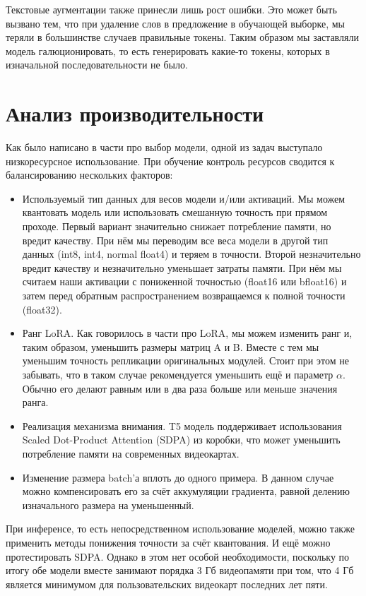 Текстовые аугментации также принесли лишь рост ошибки.
Это может быть вызвано тем, что при удаление слов в предложение в обучающей выборке, мы теряли в большинстве случаев правильные токены.
Таким образом мы заставляли модель галюционировать, то есть генерировать какие-то токены, которых в изначальной последовательности не было.

\section{Анализ производительности}
Как было написано в части про выбор модели, одной из задач выступало низкоресурсное использование.
При обучение контроль ресурсов сводится к балансированию нескольких факторов:

\begin{itemize}
  \item Используемый тип данных для весов модели и/или активаций.
  Мы можем квантовать модель или использовать смешанную точность при прямом проходе.
  Первый вариант значительно снижает потребление памяти, но вредит качеству.
  При нём мы переводим все веса модели в другой тип данных (int8, int4, normal float4) и теряем в точности.
  Второй незначительно вредит качеству и незначительно уменьшает затраты памяти.
  При нём мы считаем наши активации с пониженной точностью (float16 или bfloat16) и затем перед обратным распространением возвращаемся к полной точности (float32).
  \item Ранг LoRA.
  Как говорилось в части про LoRA, мы можем изменить ранг и, таким образом, уменьшить размеры матриц A и B.
  Вместе с тем мы уменьшим точность репликации оригинальных модулей.
  Стоит при этом не забывать, что в таком случае рекомендуется уменьшить ещё и параметр $\alpha$.
  Обычно его делают равным или в два раза больше или меньше значения ранга.
  \item Реализация механизма внимания.
  T5 модель поддерживает использования Scaled Dot-Product Attention (SDPA) из коробки, что может уменьшить потребление памяти на современных видеокартах.
  \item Изменение размера batch'а вплоть до одного примера.
  В данном случае можно компенсировать его за счёт аккумуляции градиента, равной делению изначального размера на уменьшенный.
\end{itemize}

При инференсе, то есть непосредственном использование моделей, можно также применить методы понижения точности за счёт квантования.
И ещё можно протестировать SDPA.
Однако в этом нет особой необходимости, поскольку по итогу обе модели вместе занимают порядка 3 Гб видеопамяти при том, что 4 Гб является минимумом для пользовательских видеокарт последних лет пяти.

